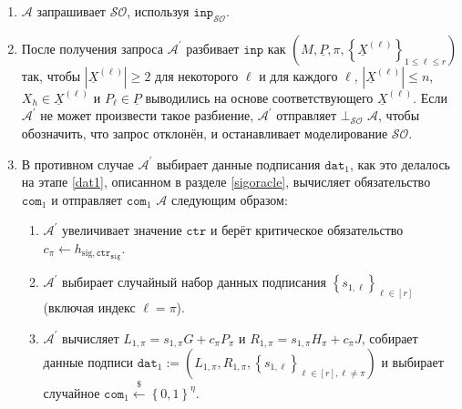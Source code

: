 \documentclass{mrl}
\theoremstyle{definition}
\numberwithin{theorem}{subsection}
\newcommand{\adversary}{\mathcal{A}}
\begin{document}
\begin{description}
\begin{description}

\begin{enumerate}
\item $\adversary$ запрашивает $\mathcal{SO}$, используя $\texttt{inp}_{\mathcal{SO}}$.

\item После получения запроса $\adversary^\prime$ разбивает $\texttt{inp}$ как $\left(M, \underline{P}, \pi, \left\{\underline{X}^{(\ell)}\right\}_{1 \leq \ell \leq r}\right)$ так, чтобы $\left|\underline{X}^{(\ell)}\right| \geq 2$ для некоторого $\ell$ и для каждого $\ell$, $\left|\underline{X}^{(\ell)}\right| \leq n$, $X_h \in \underline{X}^{(\ell)}$ и $P_\ell \in \underline{P}$ выводились на основе соответствующего $\underline{X}^{(\ell)}$. Если $\adversary^\prime$ не может произвести такое разбиение, $\adversary^\prime$ отправляет $\bot_{\mathcal{SO}}$ $\adversary$, чтобы обозначить, что запрос отклонён, и останавливает моделирование $\mathcal{SO}$.

\item В противном случае $\adversary^\prime$ выбирает данные подписания $\texttt{dat}_1$, как это делалось на этапе \ref{dat1}, описанном в разделе \ref{sigoracle}, вычисляет обязательство $\texttt{com}_1$ и отправляет $\texttt{com}_1$ $\adversary$ следующим образом:

\begin{enumerate}
\item $\adversary^\prime$ увеличивает значение $\texttt{ctr}$ и берёт критическое обязательство $c_\pi \leftarrow h_{\text{sig},\texttt{ctr}_{\texttt{sig}}}$.

\item $\adversary^\prime$ выбирает случайный набор данных подписания $\left\{s_{1,\ell}\right\}_{\ell \in [r]}$ (включая индекс $\ell = \pi$).

\item $\adversary^\prime$ вычисляет $L_{1, \pi} = s_{1,\pi} G + c_{\pi} P_\pi$ и $R_{1, \pi} = s_{1,\pi} H_\pi + c_\pi J$, собирает данные подписи $\texttt{dat}_1 := (L_{1,\pi}, R_{1,\pi}, \left\{s_{1,\ell}\right\}_{\ell \in [r], \ell \neq \pi})$ и выбирает случайное $\texttt{com}_1 \overset{\$}{\leftarrow} \left\{0,1\right\}^\eta$.


\end{enumerate}
\end{enumerate}
\end{description}
\end{description}
\end{document}
